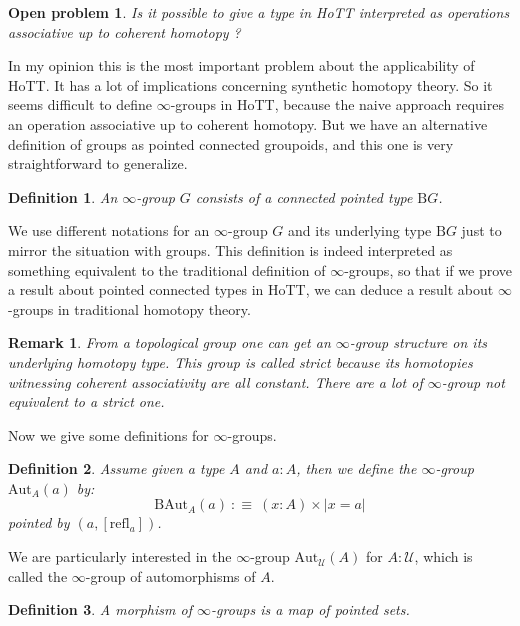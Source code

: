 \documentclass{article}
\newcommand{\U}{{\mathcal U}}
\newcommand{\refl}{\mathrm{refl}}
\newcommand{\B}{\mathrm{B}}
\newcommand{\Aut}{\mathrm{Aut}}
\newtheorem{definition}{Definition}
\newtheorem{remark}{Remark}
\newtheorem{open_problem}{Open problem}
\begin{document}
\begin{open_problem}
Is it possible to give a type in HoTT interpreted as operations associative up to coherent homotopy ?
\end{open_problem}

In my opinion this is the most important problem about the applicability of HoTT. It has a lot of implications concerning synthetic homotopy theory. So it seems difficult to define $\infty$-groups in HoTT, because the naive approach requires an operation associative up to coherent homotopy. But we have an alternative definition of groups as pointed connected groupoids, and this one is very straightforward to generalize.

\begin{definition}
An $\infty$-group $G$ consists of a connected pointed type $\B G$.
\end{definition}

We use different notations for an $\infty$-group $G$ and its underlying type $\B G$ just to mirror the situation with groups. This definition is indeed interpreted as something equivalent to the traditional definition of $\infty$-groups, so that if we prove a result about pointed connected types in HoTT, we can deduce a result about $\infty$-groups in traditional homotopy theory. 

\begin{remark}
From a topological group one can get an $\infty$-group structure on its underlying homotopy type. This group is called strict because its homotopies witnessing coherent associativity are all constant. There are a lot of $\infty$-group not equivalent to a strict one.%
\end{remark}

Now we give some definitions for $\infty$-groups.

\begin{definition}
Assume given a type $A$ and $a:A$, then we define the $\infty$-group $\Aut_A(a)$ by:
\[\B \Aut_A(a) \ :\equiv\ (x:A)\times |x=a|\]
pointed by $(a,[\refl_a])$.
\end{definition}

We are particularly interested in the $\infty$-group $\Aut_\U(A)$ for $A:\U$, which is called the $\infty$-group of automorphisms of $A$.

\begin{definition}
A morphism of $\infty$-groups is a map of pointed sets. 
\end{definition}
\end{document}
